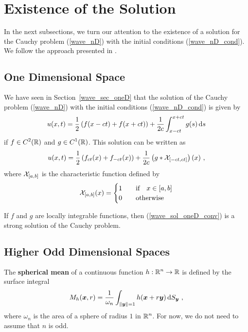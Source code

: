 \section{Existence of the Solution} \label{SectWavenDExSol}

In the next subsections, we turn our attention to the existence of a
solution for the Cauchy problem (\ref{wave_nD}) with the initial conditions
(\ref{wave_nD_cond}).  We follow the approach presented in \cite{FoPDE}.

\subsection{One Dimensional Space}

We have seen in Section~\ref{wave_sec_oneD} that the solution of the
Cauchy problem (\ref{wave_nD}) with the initial conditions
(\ref{wave_nD_cond}) is given by
\[
u(x,t) = \frac{1}{2} \left(f(x-ct) + f(x+ct)\right)
+ \frac{1}{2c} \int_{x-ct}^{x+ct} g(s)\,\mathrm{d}{s}
\]
if $\displaystyle f \in C^2(\mathbb{R})$ and $\displaystyle g \in C^1(\mathbb{R})$.
This solution can be written as
\begin{equation} \label{wave_sol_oneD_conv}
u(x,t) = \frac{1}{2} \left( f_{ct}(x) + f_{-ct}(x) \right) +
\frac{1}{2c} \left(g \ast {\cal X}_{[-ct,ct]}\right)(x) \ ,
\end{equation}
where ${\cal X}_{[a,b]}$ is the characteristic function defined by
\[
{\cal X}_{[a,b]}(x) = \begin{cases}
1 & \quad \text{if} \quad x \in [a,b] \\
0 & \quad \text{otherwise}
\end{cases}
\]

If $f$ and $g$ are locally integrable functions, then
(\ref{wave_sol_oneD_conv}) is a strong solution of the Cauchy problem.

\subsection{Higher Odd Dimensional Spaces} \label{wave_HODS}

The {\bfseries spherical mean} of a continuous function
$\displaystyle h:\mathbb{R}^n\rightarrow \mathbb{R}$ is defined by the surface integral
\begin{equation} \label{wave_nD_idx1}
M_h({\bm{x}},r) = \frac{1}{\omega_n} \int_{\|{\bm{y}}\|=1} h({\bm{x}} + r {\bm{y}}) 
\,\mathrm{d}{S}_{{\bm{y}}} \ ,
\end{equation}
where $\omega_n$ is the area of a sphere of radius $1$ in $\displaystyle \mathbb{R}^n$.
For now, we do not need to assume that $n$ is odd.

